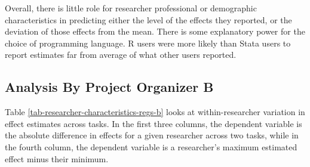 \documentclass[
  letterpaper,
  DIV=11,
  numbers=noendperiod]{scrartcl}
\begin{document}
Overall, there is little role for researcher professional or demographic
characteristics in predicting either the level of the effects they
reported, or the deviation of those effects from the mean. There is some
explanatory power for the choice of programming language. R users were
more likely than Stata users to report estimates far from average of
what other users reported.

\hypertarget{analysis-by-project-organizer-b}{%
\subsection{Analysis By Project Organizer
B}\label{analysis-by-project-organizer-b}}

Table \ref{tab-researcher-characteristics-regs-b} looks at
within-researcher variation in effect estimates across tasks. In the
first three columns, the dependent variable is the absolute difference
in effects for a given researcher across two tasks, while in the fourth
column, the dependent variable is a researcher's maximum estimated
effect minus their minimum.
\end{document}
